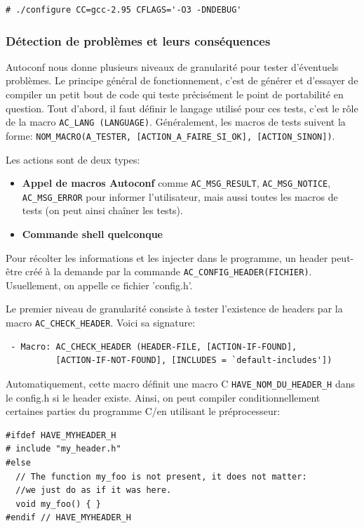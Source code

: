 \documentclass[11pt,a4paper]{article}
\newcommand{\bitem}{\item[$\bullet$]}
\begin{document}
{\small
\begin{verbatim}
# ./configure CC=gcc-2.95 CFLAGS='-O3 -DNDEBUG'
\end{verbatim}
}

\subsubsection{Détection de problèmes et leurs conséquences}

Autoconf nous donne plusieurs niveaux de granularité pour tester
d'éventuels problèmes. Le principe général de fonctionnement, c'est de
générer et d'essayer de compiler un petit bout de code qui teste
précisément le point de portabilité en question. Tout d'abord, il faut
définir le langage utilisé pour ces tests, c'est le rôle de la macro
\texttt{AC\_LANG (LANGUAGE)}. Généralement, les macros de tests
suivent la forme: \texttt{NOM\_MACRO(A\_TESTER, [ACTION\_A\_FAIRE\_SI\_OK],
  [ACTION\_SINON])}.

Les actions sont de deux types:

\begin{itemize}
\bitem \textbf{Appel de macros Autoconf} comme \texttt{AC\_MSG\_RESULT},
\texttt{AC\_MSG\_NOTICE}, \texttt{AC\_MSG\_ERROR} pour informer
l'utilisateur, mais aussi toutes les macros de tests (on peut ainsi
chaîner les tests).
\bitem \textbf{Commande shell quelconque}
\end{itemize}

Pour récolter les informations et les injecter dans le programme, un
header peut-être créé à la demande par la commande
\texttt{AC\_CONFIG\_HEADER(FICHIER)}. Usuellement, on appelle ce
fichier 'config.h'.

Le premier niveau de granularité consiste à tester l'existence de
headers par la macro \texttt{AC\_CHECK\_HEADER}. Voici sa signature:
{\small
\begin{verbatim}
 - Macro: AC_CHECK_HEADER (HEADER-FILE, [ACTION-IF-FOUND],
          [ACTION-IF-NOT-FOUND], [INCLUDES = `default-includes'])
\end{verbatim}
}

Automatiquement, cette macro définit une macro C
\texttt{HAVE\_NOM\_DU\_HEADER\_H} dans le config.h si le header
existe. Ainsi, on peut compiler conditionnellement certaines parties
du programme C/\cpp en utilisant le préprocesseur:

{\small
\begin{verbatim}
#ifdef HAVE_MYHEADER_H
# include "my_header.h"
#else
  // The function my_foo is not present, it does not matter:
  //we just do as if it was here.
  void my_foo() { }
#endif // HAVE_MYHEADER_H
\end{verbatim}
}
\end{document}
